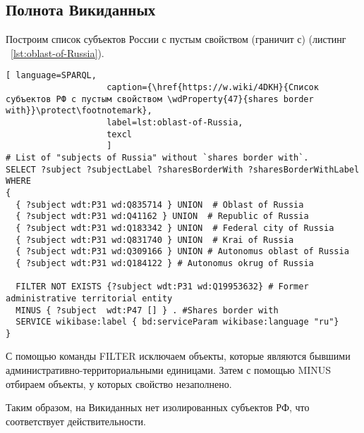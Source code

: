 \subsection{Полнота Викиданных}

Построим список субъектов России с пустым свойством  (граничит с) (листинг ~\protect\ref{lst:oblast-of-Russia}).

\begin{lstlisting}[ language=SPARQL, 
                    caption={\href{https://w.wiki/4DKH}{Список субъектов РФ с пустым свойством \wdProperty{47}{shares border with}}\protect\footnotemark},
                    label=lst:oblast-of-Russia,
                    texcl 
                    ]
# List of "subjects of Russia" without `shares border with`. 
SELECT ?subject ?subjectLabel ?sharesBorderWith ?sharesBorderWithLabel
WHERE
{
  { ?subject wdt:P31 wd:Q835714 } UNION  # Oblast of Russia
  { ?subject wdt:P31 wd:Q41162 } UNION  # Republic of Russia
  { ?subject wdt:P31 wd:Q183342 } UNION  # Federal city of Russia
  { ?subject wdt:P31 wd:Q831740 } UNION  # Krai of Russia
  { ?subject wdt:P31 wd:Q309166 } UNION # Autonomus oblast of Russia
  { ?subject wdt:P31 wd:Q184122 } # Autonomus okrug of Russia
  
  FILTER NOT EXISTS {?subject wdt:P31 wd:Q19953632} # Former administrative territorial entity
  MINUS { ?subject  wdt:P47 [] } . #Shares border with 
  SERVICE wikibase:label { bd:serviceParam wikibase:language "ru"}
}
\end{lstlisting}%

С помощью команды FILTER исключаем объекты, которые являются бывшими административно-территориальными единицами. Затем с помощью MINUS отбираем объекты, у которых свойство  незаполнено.

Таким образом, на Викиданных нет изолированных субъектов РФ, что соответствует действительности.

